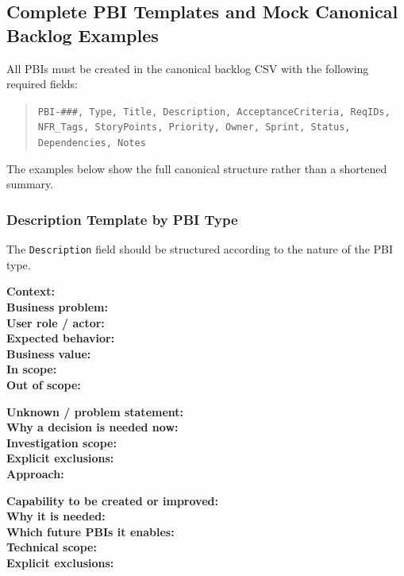\documentclass[11pt,a4paper]{article}
\begin{document}
\subsection{Complete PBI Templates and Mock Canonical Backlog Examples}

All PBIs must be created in the canonical backlog CSV with the following required fields:

\begin{quote}
\texttt{PBI-\#\#\#, Type, Title, Description, AcceptanceCriteria, ReqIDs, NFR\_Tags, StoryPoints, Priority, Owner, Sprint, Status, Dependencies, Notes}
\end{quote}

The examples below show the full canonical structure rather than a shortened summary.

\subsubsection*{Description Template by PBI Type}

The \texttt{Description} field should be structured according to the nature of the PBI type.

\begin{tcolorbox}[colback=white,colframe=black,title=Story --- Description Template]
\textbf{Context:} \\
\textbf{Business problem:} \\
\textbf{User role / actor:} \\
\textbf{Expected behavior:} \\
\textbf{Business value:} \\
\textbf{In scope:} \\
\textbf{Out of scope:}
\end{tcolorbox}

\begin{tcolorbox}[colback=white,colframe=black,title=Spike --- Description Template]
\textbf{Unknown / problem statement:} \\
\textbf{Why a decision is needed now:} \\
\textbf{Investigation scope:} \\
\textbf{Explicit exclusions:} \\
\textbf{Approach:}
\end{tcolorbox}

\begin{tcolorbox}[colback=white,colframe=black,title=Enabler --- Description Template]
\textbf{Capability to be created or improved:} \\
\textbf{Why it is needed:} \\
\textbf{Which future PBIs it enables:} \\
\textbf{Technical scope:} \\
\textbf{Explicit exclusions:}
\end{tcolorbox}
\end{document}
